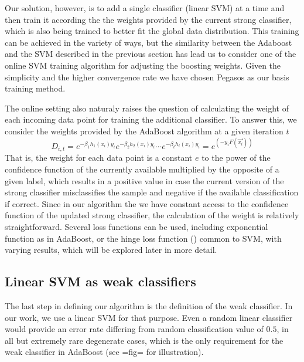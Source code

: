 Our solution, however, is to add a single classifier (linear SVM) at a time and then train it according the the weights provided by the current strong classifier, which is also being trained to better fit the global data distribution. This training can be achieved in the variety of ways, but the similarity between the Adaboost and the SVM described in the previous section has lead us to consider one of the online SVM training algorithm for adjusting the boosting weights. Given the simplicity and the higher convergence rate we have chosen Pegasos as our basis training method. 

The online setting also naturaly raises the question of calculating the weight of each incoming data point for training the additional classifier.  To answer this, we consider the weights provided by the AdaBoost algorithm at a given iteration $t$
$$
D_{i,t} = e^{-\beta_1 h_1(x_i) y_i}e^{-\beta_2 h_2(x_i) y_i}\cdots e^{-\beta_t h_t(x_i) y_i}=e^(-y_i F(\vec{x_i}))
$$
That is, the weight for each data point is a constant $e$ to the power of the confidence function of the currently available multiplied by the opposite of a given label, which results in a positive value in case the current version of the strong classifier misclassifies the sample and negative if the available classification if correct. Since in our algorithm the we have constant access to the confidence function of the updated strong classifier, the calculation of the weight is relatively straightforward. Several loss functions can be used, including exponential function as in AdaBoost, or the hinge loss function () common to SVM, with varying results, which will be explored later in more detail. 
\subsection{Linear SVM as weak classifiers}

The last step in defining our algorithm is the definition of the weak classifier. In our work, we use a linear SVM for that purpose. Even a random linear classifier would provide an error rate differing from random classification value of $0.5$, in all but extremely rare degenerate cases, which is the only requirement for the weak classifier in AdaBoost (see {{=fig=}} for illustration).

